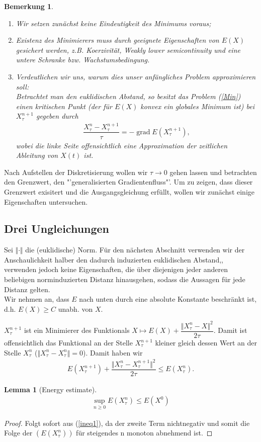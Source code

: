 \documentclass[11pt,a4paper,notitlepage]{scrreprt}
\newcommand{\grad}{\operatorname{grad}}
\newtheorem{lem}[defi]{Lemma}
\newtheorem{bem}[defi]{Bemerkung}
\begin{document}
\begin{bem}
\begin{enumerate}
\item Wir setzen zunächst keine Eindeutigkeit des Minimums voraus;
\item Existenz des Minimierers muss durch geeignete Eigenschaften von $E(X)$ gesichert werden, z.B. Koerzivität, Weakly lower semicontinuity und eine untere Schranke bzw. Wachstumsbedingung. 
\item Verdeutlichen wir uns, warum dies unser anfängliches Problem approximieren soll:\\
Betrachtet man den euklidischen Abstand, so besitzt das Problem (\ref{Min}) einen kritischen Punkt (der für $E(X)$ konvex ein globales Minimum ist) bei $X_\tau^{n+1}$ gegeben durch 
\begin{eqnarray*}
\dfrac{X_\tau^n-X_\tau^{n+1}}{\tau}=-\grad E(X_\tau^{n+1}),
\end{eqnarray*}
wobei die linke Seite offensichtlich eine Approximation der zeitlichen Ableitung von $X(t)$ ist.
\end{enumerate}
\end{bem}
\vspace{3pt}
Nach Aufstellen der Diskretisierung wollen wir $\tau \to 0$ gehen lassen und betrachten den Grenzwert, den "'generalisierten Gradientenfluss"'.
Um zu zeigen, dass dieser Grenzwert exisitert und die Ausgangsgleichung erfüllt, wollen wir zunächst einige Eigenschaften untersuchen. 

\subsection{Drei Ungleichungen}
Sei $\Vert \cdot \Vert$ die (euklidische) Norm. Für den nächsten Abschnitt verwenden wir der Anschaulichkeit halber den dadurch induzierten euklidischen Abstand,, verwenden jedoch keine Eigenschaften, die über diejenigen jeder anderen beliebigen norminduzierten Distanz hinausgehen, sodass die Aussagen für jede Distanz gelten.\\
 Wir nehmen an, dass $E$ nach unten durch eine absolute Konstante beschränkt ist, d.h. $E(X)\geq C$ unabh. von $X$.
\newline


$X_\tau^{n+1}$ ist ein Minimierer des Funktionals $X \mapsto E(X)+\dfrac{\Vert X_\tau^n-X\Vert^2}{2\tau}$. Damit ist offensichtlich das Funktional an der Stelle $X_\tau^{n+1}$ kleiner gleich dessen Wert an der Stelle $X_\tau^n$ ($\Vert X_\tau^n-X_\tau^n\Vert=0$). Damit haben wir
\begin{eqnarray}
E(X_\tau^{n+1})+\dfrac{\Vert X_\tau^n-X_\tau^{n+1}\Vert^2}{2\tau}\leq E(X_\tau^n). \label{ineq1}
\end{eqnarray} 
\begin{lem}[Energy estimate]
\begin{eqnarray}
\sup_{n\geq 0}E(X_\tau^n)\leq E(X^0) \label{enest}
\end{eqnarray}
\end{lem}
\begin{proof}
Folgt sofort aus (\ref{ineq1}), da der zweite Term nichtnegativ und somit die Folge der $(E(X_\tau^n))$ für steigendes n monoton abnehmend ist. 
\end{proof}
\end{document}
